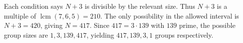 Each condition says $N+3$ is divisible by the relevant size. Thus $N+3$ is a multiple of $\operatorname{lcm}(7,6,5)=210$. The only possibility in the allowed interval is $N+3=420$, giving $\boxed{N=417}$. Since $417=3\cdot139$ with $139$ prime, the possible group sizes are $\boxed{1,3,139,417}$, yielding $417,139,3,1$ groups respectively.
